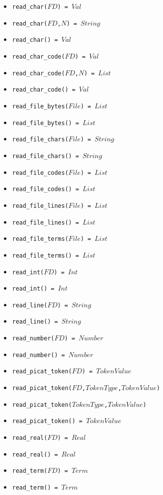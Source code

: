 \documentclass[10pt]{article}
\begin{document}
\begin{multicols}{2}
\begin{scriptsize}
\begin{itemize}
   \item \texttt{read\_char($FD$) = $Val$}
   \item \texttt{read\_char($FD$,$N$) = $String$}
   \item \texttt{read\_char() = $Val$}
   \item \texttt{read\_char\_code($FD$) = $Val$}
   \item \texttt{read\_char\_code($FD$,$N$) = $List$}
   \item \texttt{read\_char\_code() = $Val$}
   \item \texttt{read\_file\_bytes($File$) = $List$}
   \item \texttt{read\_file\_bytes() = $List$}
   \item \texttt{read\_file\_chars($File$) = $String$}
   \item \texttt{read\_file\_chars() = $String$}
   \item \texttt{read\_file\_codes($File$) = $List$}
   \item \texttt{read\_file\_codes() = $List$}
   \item \texttt{read\_file\_lines($File$) = $List$}
   \item \texttt{read\_file\_lines() = $List$}
   \item \texttt{read\_file\_terms($File$) = $List$}
   \item \texttt{read\_file\_terms() = $List$}
   \item \texttt{read\_int($FD$) = $Int$}
   \item \texttt{read\_int() = $Int$}
   \item \texttt{read\_line($FD$) = $String$}
   \item \texttt{read\_line() = $String$}
   \item \texttt{read\_number($FD$) = $Number$}
   \item \texttt{read\_number() = $Number$}
   \item \texttt{read\_picat\_token($FD$) = $TokenValue$}
   \item \texttt{read\_picat\_token($FD$,$TokenType$,$TokenValue$)}
   \item \texttt{read\_picat\_token($TokenType$,$TokenValue$)}
   \item \texttt{read\_picat\_token() = $TokenValue$}
   \item \texttt{read\_real($FD$) = $Real$}
   \item \texttt{read\_real() = $Real$}
   \item \texttt{read\_term($FD$) = $Term$}
   \item \texttt{read\_term() = $Term$}

\end{itemize}
\end{scriptsize}
\end{multicols}
\end{document}
